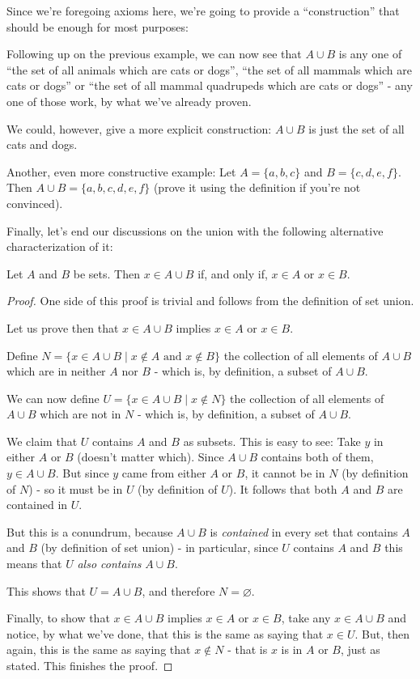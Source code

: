 Since we're foregoing axioms here, we're going to provide a ``construction'' that should be enough for most purposes:

\begin{ex}
	Following up on the previous example, we can now see that $A\cup B$ is any one of ``the set of all animals which are cats or dogs'', ``the set of all mammals which are cats or dogs'' or ``the set of all mammal quadrupeds which are cats or dogs'' - any one of those work, by what we've already proven.
	
	We could, however, give a more explicit construction: $A\cup B$ is just the set of all cats and dogs.
\end{ex}
\begin{ex}
	Another, even more constructive example: Let $A=\{a,b,c\}$ and $B=\{c,d,e,f\}$. Then $A\cup B=\{a,b,c,d,e,f\}$ (prove it using the definition if you're not convinced).
\end{ex}

Finally, let's end our discussions on the union with the following alternative characterization of it:

\begin{lemma}
	Let $A$ and $B$ be sets. Then $x\in A\cup B$ if, and only if, $x\in A$ or $x\in B$.
\end{lemma}
\begin{proof}
	One side of this proof is trivial and follows from the definition of set union.
	
	Let us prove then that $x\in A\cup B$ implies $x\in A$ or $x\in B$.
	
	Define $N=\{x\in A\cup B\mid x\notin A\mbox{ and }x\notin B\}$ the collection of all elements of $A\cup B$ which are in neither $A$ nor $B$ - which is, by definition, a subset of $A\cup B$.
	
	We can now define $U=\{x\in A\cup B\mid x\notin N\}$ the collection of all elements of $A\cup B$ which are not in $N$ - which is, by definition, a subset of $A\cup B$.
	
	We claim that $U$ contains $A$ and $B$ as subsets. This is easy to see: Take $y$ in either $A$ or $B$ (doesn't matter which). Since $A\cup B$ contains both of them, $y\in A\cup B$. But since $y$ came from either $A$ or $B$, it cannot be in $N$ (by definition of $N$) - so it must be in $U$ (by definition of $U$). It follows that both $A$ and $B$ are contained in $U$.
	
	But this is a conundrum, because $A\cup B$ is \textit{contained} in every set that contains $A$ and $B$ (by definition of set union) - in particular, since $U$ contains $A$ and $B$ this means that $U$ \textit{also contains} $A\cup B$.
	
	This shows that $U=A\cup B$, and therefore $N=\varnothing$.
	
	Finally, to show that $x\in A\cup B$ implies $x\in A$ or $x\in B$, take any $x\in A\cup B$ and notice, by what we've done, that this is the same as saying that $x\in U$. But, then again, this is the same as saying that $x\notin N$ - that is $x$ is in $A$ or $B$, just as stated. This finishes the proof.
\end{proof}


